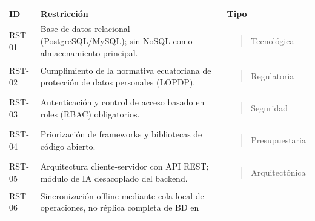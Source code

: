\documentclass[
]{article}
\newcounter{none} %
\begin{document}
{\def\LTcaptype{none} %
\begin{longtable}[]{@{}
  >{\raggedright\arraybackslash}p{}
  >{\raggedright\arraybackslash}p{}
  >{\raggedright\arraybackslash}p{}@{}}
\toprule\noalign{}
\begin{minipage}[b]{\linewidth}\centering
\textbf{ID}
\end{minipage} & \begin{minipage}[b]{\linewidth}\centering
\textbf{Restricción}
\end{minipage} & \begin{minipage}[b]{\linewidth}\centering
\textbf{Tipo}
\end{minipage} \\
\midrule\noalign{}
\endhead
\bottomrule\noalign{}
\endlastfoot
RST-01 & Base de datos relacional (PostgreSQL/MySQL); sin NoSQL como
almacenamiento principal. & \begin{minipage}[t]{\linewidth}\raggedright
\begin{quote}
Tecnológica
\end{quote}
\end{minipage} \\
RST-02 & Cumplimiento de la normativa ecuatoriana de protección de datos
personales (LOPDP). & \begin{minipage}[t]{\linewidth}\raggedright
\begin{quote}
Regulatoria
\end{quote}
\end{minipage} \\
RST-03 & Autenticación y control de acceso basado en roles (RBAC)
obligatorios. & \begin{minipage}[t]{\linewidth}\raggedright
\begin{quote}
Seguridad
\end{quote}
\end{minipage} \\
RST-04 & Priorización de frameworks y bibliotecas de código abierto. &
\begin{minipage}[t]{\linewidth}\raggedright
\begin{quote}
Presupuestaria
\end{quote}
\end{minipage} \\
RST-05 & Arquitectura cliente-servidor con API REST; módulo de IA
desacoplado del backend. & \begin{minipage}[t]{\linewidth}\raggedright
\begin{quote}
Arquitectónica
\end{quote}
\end{minipage} \\
RST-06 & Sincronización offline mediante cola local de operaciones, no
réplica completa de BD en


\end{longtable}}
\end{document}
